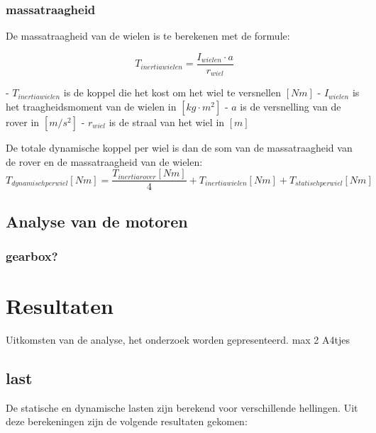\documentclass{article}
\begin{document}
        \subsubsection*{massatraagheid}

        De massatraagheid van de wielen is te berekenen met de formule:

        $$T_{inertiawielen} = \frac{I_{wielen} \cdot a}{r_{wiel}}$$
        
        - $T_{inertiawielen}$ is de koppel die het kost om het wiel te versnellen $[Nm]$ \newline
        - $I_{wielen}$ is het traagheidsmoment van de wielen in $[kg \cdot m^2]$ \newline
        - $a$ is de versnelling van de rover in $[m/s^2]$ \newline
        - $r_{wiel}$ is de straal van het wiel in $[m]$ \newline \newline

        De totale dynamische koppel per wiel is dan de som van de massatraagheid van de rover en de massatraagheid van de wielen:
        $$T_{dynamisch per wiel}[Nm] = \frac{T_{inertiarover}[Nm]}{4} + T_{inertiawielen}[Nm] + T_{statischperwiel}[Nm]$$ 


\subsection{Analyse van de motoren}
\subsubsection{gearbox?}

\section{Resultaten}
    Uitkomsten van de analyse, het onderzoek worden gepresenteerd. max 2 A4tjes

    \subsection{last}
    De statische en dynamische lasten zijn berekend voor verschillende hellingen. Uit deze berekeningen zijn de volgende resultaten gekomen: 
\end{document}
